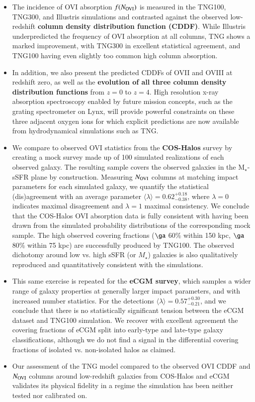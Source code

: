 \documentclass[useAMS,usenatbib]{mnras}
\newcommand{\ovi}{OVI\xspace}
\newcommand{\ovii}{OVII\xspace}
\newcommand{\oviii}{OVIII\xspace}
\begin{document}
\begin{itemize}
\item The incidence of \ovi absorption $f(N_{\rm OVI})$ is measured in the TNG100, TNG300, and Illustris simulations and contrasted against the observed low-redshift \textbf{column density distribution function (CDDF)}. While Illustris underpredicted the frequency of \ovi absorption at all columns, TNG shows a marked improvement, with TNG300 in excellent statistical agreement, and TNG100 having even slightly too common high column absorption.
\item In addition, we also present the predicted CDDFs of \ovii and \oviii at redshift zero, as well as the \textbf{evolution of all three column density distribution functions} from $z=0$ to $z=4$. High resolution x-ray absorption spectroscopy enabled by future mission concepts, such as the grating spectrometer on Lynx, will provide powerful constraints on these three adjacent oxygen ions for which explicit predictions are now available from hydrodynamical simulations such as TNG.
\item We compare to observed \ovi statistics from the \textbf{COS-Halos} survey by creating a mock survey made up of 100 simulated realizations of each observed galaxy. The resulting sample covers the observed galaxies in the M$_\star$-sSFR plane by construction. Measuring $N_{\rm OVI}$ columns at matching impact parameters for each simulated galaxy, we quantify the statistical (dis)agreement with an average parameter $\langle\lambda\rangle = 0.62^{+0.18}_{-0.38}$, where $\lambda=0$ indicates maximal disagreement and $\lambda=1$ maximal consistency. We conclude that the COS-Halos \ovi absorption data is fully consistent with having been drawn from the simulated probability distributions of the corresponding mock sample. The high observed covering fractions ($\ga$ 60\% within 150 kpc, $\ga$ 80\% within 75 kpc) are successfully produced by TNG100. The observed dichotomy around low vs. high sSFR (or $M_\star$) galaxies is also qualitatively reproduced and quantitatively consistent with the simulations.
\item This same exercise is repeated for the \textbf{eCGM survey}, which samples a wider range of galaxy properties at generally larger impact parameters, and with increased number statistics. For the detections $\langle\lambda\rangle = 0.57^{+0.30}_{-0.21}$, and we conclude that there is no statistically significant tension between the eCGM dataset and TNG100 simulation. We recover with excellent agreement the covering fractions of eCGM split into early-type and late-type galaxy classifications, although we do not find a signal in the differential covering fractions of isolated vs. non-isolated halos as claimed.
\item Our assessment of the TNG model compared to the observed \ovi CDDF and $N_{\rm OVI}$ columns around low-redshift galaxies from COS-Halos and eCGM validates its physical fidelity in a regime the simulation has been neither tested nor calibrated on. 
\end{itemize}
\end{document}
